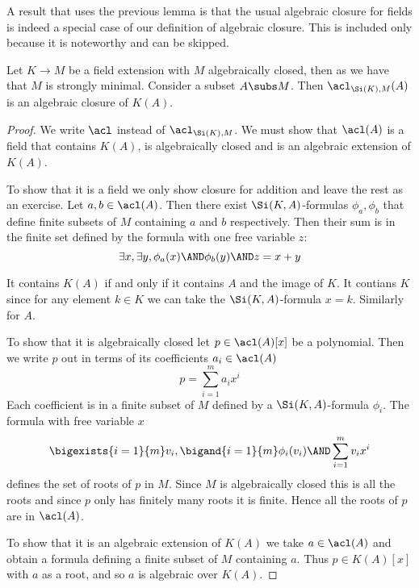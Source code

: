 A result that uses the previous lemma is that the usual algebraic closure
for fields is indeed a special case of our definition of algebraic closure.
This is included only because it is noteworthy and can be skipped.
\begin{prop}
    Let $K \to M$ be a field extension with $M$ algebraically closed, 
    then as  
    we have that $M$ is strongly minimal.
    Consider a subset $A \subs M$.
    Then $\acl_{\Si(K),M}(A)$ is an algebraic closure of $K(A)$.
\end{prop}
\begin{proof}
    We write $\acl$ instead of $\acl_{\Si(K),M}$.
    We must show that $\acl(A)$ is a field that contains $K(A)$, 
    is algebraically closed and is an algebraic extension of 
    $K(A)$.

    To show that it is a field we only show closure for addition and leave
    the rest as an exercise. 
    Let $a, b \in \acl(A)$.
    Then there exist $\Si(K,A)$-formulas $\phi_a,\phi_b$ that define 
    finite subsets of $M$ containing $a$ and $b$ respectively.
    Then their sum is in the finite set defined by the formula with one free
    variable $z$:
    \[
        \exists x, \exists y, \phi_a(x) \AND \phi_b(y) \AND z = x + y
    \]

    It contains $K(A)$ if and only if it contains $A$ and the image of $K$.
    It contians $K$ since for any element $k \in K$ we can take the 
    $\Si(K,A)$-formula $x = k$. 
    Similarly for $A$.

    To show that it is algebraically closed let 
    $p \in \acl(A)[x]$ be a polynomial.
    Then we write $p$ out in terms of its coefficients $a_i \in \acl(A)$
    \[p = \sum_{i = 1}^m a_i x^i\]
    Each coefficient is in a finite subset of $M$
    defined by a $\Si(K,A)$-formula $\phi_i$.
    The formula with free variable $x$
    \[
        \bigexists{i = 1}{m} v_i, \bigand{i = 1}{m} \phi_i(v_i) \AND 
        \sum_{i = 1}^m v_i x^i
    \]
    defines the set of roots of $p$ in $M$.
    Since $M$ is algebraically closed this is all the roots and since
    $p$ only has finitely many roots it is finite.
    Hence all the roots of $p$ are in $\acl(A)$.

    To show that it is an algebraic extension of $K(A)$ we take $a \in \acl(A)$
    and obtain a formula defining a finite subset of $M$ containing $a$.
    Thus 
    $p \in K(A)[x]$ with $a$ as a root, and so $a$ is algebraic over $K(A)$.
\end{proof}


